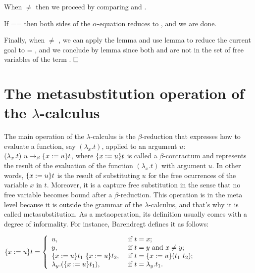 \begin{coqdoccode}
\end{coqdoccode}
When  \ensuremath{\not=}  then we proceed by comparing  and .
\begin{coqdoccode}
\end{coqdoccode}
If  ==  then both sides of the $\alpha$-equation reduces to    , and we are done. 
\begin{coqdoccode}
\end{coqdoccode}
Finally, when  \ensuremath{\not=} , we can apply the lemma  and use lemma  to reduce the current goal to     = , and we conclude by lemma  since both  and  are not in the set of free variables of the term . $\hfill\Box$
\begin{coqdoccode}
\coqdocemptyline
\end{coqdoccode}
\section{The metasubstitution operation of the $\lambda$-calculus}



 The main operation of the $\lambda$-calculus is the $\beta$-reduction that expresses how to evaluate a function, say $(\lambda_x.t)$, applied to an argument $u$: $(\lambda_x.t)\ u \to_{\beta} \metasub{t}{x}{u}$, where $\metasub{t}{x}{u}$ is called a $\beta$-contractum and represents the result of the evaluation of the function $(\lambda_x.t)$ with argument $u$. In other words, $\metasub{t}{x}{u}$ is the result of substituting $u$ for the free ocurrences of the variable $x$ in $t$. Moreover, it is a capture free substitution in the sense that no free variable becomes bound after a $\beta$-reduction. This operation is in the meta level because it is outside the grammar of the $\lambda$-calculus, and that's why it is called metasubstitution. As a metaoperation, its definition usually comes with a degree of informality. For instance, Barendregt \cite{barendregtLambdaCalculusIts1984} defines it as follows:


\vspace{.5cm}
$\metasub{t}{x}{u} = \left\{
 \begin{array}{ll}
  u, & \mbox{ if } t = x; \\
  y, & \mbox{ if } t = y \mbox{ and } x \neq y; \\
  \metasub{t_1}{x}{u}\ \metasub{t_2}{x}{u}, & \mbox{ if } t = \metasub{(t_1\ t_2)}{x}{u}; \\
  \lambda_y.(\metasub{t_1}{x}{u}), & \mbox{ if } t = \lambda_y.t_1.
 \end{array}\right.$ \vspace{.5cm}



